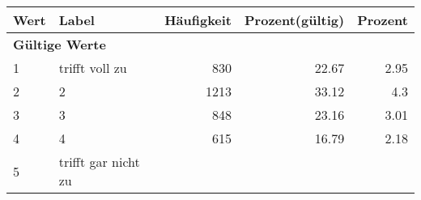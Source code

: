      \begin{longtable}{lXrrr}
     \toprule
     \textbf{Wert} & \textbf{Label} & \textbf{Häufigkeit} & \textbf{Prozent(gültig)} & \textbf{Prozent} \\
     \endhead
     \midrule
     \multicolumn{5}{l}{\textbf{Gültige Werte}}\\

     1 &
     \multicolumn{1}{X}{ trifft voll zu   } &


       \num{830} &
       \num[round-mode=places,round-precision=2]{22,67} &
         \num[round-mode=places,round-precision=2]{2,95} \\

     2 &
     \multicolumn{1}{X}{ 2   } &


       \num{1213} &
       \num[round-mode=places,round-precision=2]{33,12} &
         \num[round-mode=places,round-precision=2]{4,3} \\

     3 &
     \multicolumn{1}{X}{ 3   } &


       \num{848} &
       \num[round-mode=places,round-precision=2]{23,16} &
         \num[round-mode=places,round-precision=2]{3,01} \\

     4 &
     \multicolumn{1}{X}{ 4   } &


       \num{615} &
       \num[round-mode=places,round-precision=2]{16,79} &
         \num[round-mode=places,round-precision=2]{2,18} \\

     5 &
     \multicolumn{1}{X}{ trifft gar nicht zu   } &



\end{longtable}
